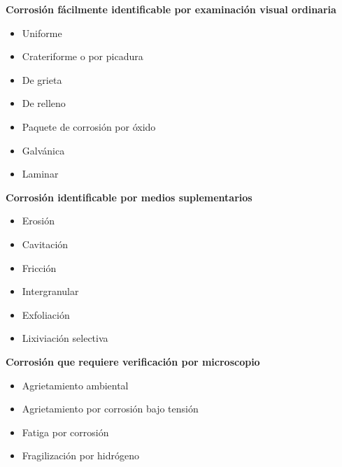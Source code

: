 \begin{tcbraster}[
	raster columns=3,
	raster equal height,
	size=small,
	title={\centering\bfseries\large Grupo \thetcbrasternum}
]	
	\begin{tcolorbox}[
		coltitle=white,
		colbacktitle=primary,
	]
		\vspace*{3mm}
		\begin{center}
			\bf Corrosión fácilmente identificable por examinación visual ordinaria
		\end{center}
		\begin{itemize}[nolistsep]
			\item Uniforme
			\item Crateriforme o por picadura
			\item De grieta
			\item De relleno
			\item Paquete de corrosión por óxido
			\item Galvánica
			\item Laminar
		\end{itemize}
	\end{tcolorbox}%
	\begin{tcolorbox}[
		coltitle=white,
		colbacktitle=accent,
	]
		\vspace*{3mm}
		\begin{center}
			\bf Corrosión identificable por medios suplementarios
		\end{center}
		\begin{itemize}[nolistsep]
			\item Erosión
			\item Cavitación
			\item Fricción
			\item Intergranular
			\item Exfoliación
			\item Lixiviación selectiva
		\end{itemize}
	\end{tcolorbox}%
	\begin{tcolorbox}[
		coltitle=white,
		colbacktitle=secondary,
	]
		\vspace*{3mm}
		\begin{center}
			\bf Corrosión que requiere verificación por microscopio
		\end{center}
		\begin{itemize}[nolistsep]
			\item Agrietamiento ambiental
			\item Agrietamiento por corrosión bajo tensión 
			\item Fatiga por corrosión
			\item Fragilización por hidrógeno
		\end{itemize}
	\end{tcolorbox}
	
\end{tcbraster}
